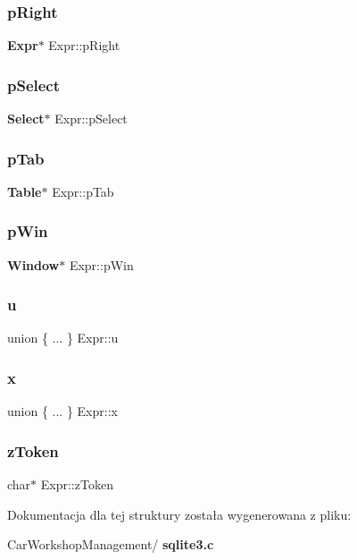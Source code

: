 \mbox{\label{struct_expr_aa08c218d5b0b6f8882e8bf9ec8822a08}} 
\subsubsection{pRight}
{\footnotesize\ttfamily \textbf{ Expr}$\ast$ Expr\+::p\+Right}

\mbox{\label{struct_expr_a54e5186fdf157f8b4ae178919d8ff6b3}} 
\subsubsection{pSelect}
{\footnotesize\ttfamily \textbf{ Select}$\ast$ Expr\+::p\+Select}

\mbox{\label{struct_expr_a27c8824b41d853eeeebe61cf3ac1ae5a}} 
\subsubsection{pTab}
{\footnotesize\ttfamily \textbf{ Table}$\ast$ Expr\+::p\+Tab}

\mbox{\label{struct_expr_ab20f317c03ee3a78fe0b10bd306f6a26}} 
\subsubsection{pWin}
{\footnotesize\ttfamily \textbf{ Window}$\ast$ Expr\+::p\+Win}

\mbox{\label{struct_expr_a5a43a51aa0ee7afc9babcdc337dd77db}} 
\subsubsection{u}
{\footnotesize\ttfamily union \{ ... \}   Expr\+::u}

\mbox{\label{struct_expr_a9ff6313055718299e20a19e551dcbf0a}} 
\subsubsection{x}
{\footnotesize\ttfamily union \{ ... \}   Expr\+::x}

\mbox{\label{struct_expr_af1f6b0c5fcfdd18a41f682b74e13c950}} 
\subsubsection{zToken}
{\footnotesize\ttfamily char$\ast$ Expr\+::z\+Token}



Dokumentacja dla tej struktury została wygenerowana z pliku\+:\begin{DoxyCompactItemize}
\item 
Car\+Workshop\+Management/\textbf{ sqlite3.\+c}\end{DoxyCompactItemize}
